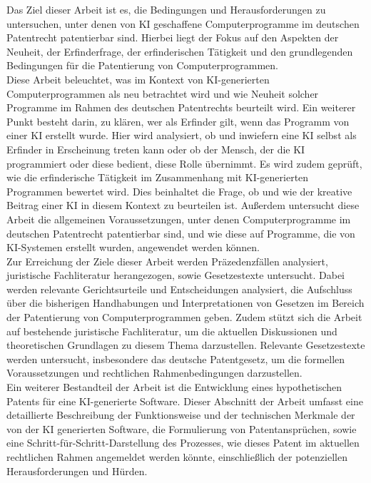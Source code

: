 Das Ziel dieser Arbeit ist es, 
die Bedingungen und Herausforderungen zu untersuchen,
unter denen von KI geschaffene Computerprogramme im deutschen Patentrecht 
patentierbar sind. Hierbei liegt der Fokus auf den Aspekten der Neuheit, 
der Erfinderfrage, der erfinderischen Tätigkeit 
und den grundlegenden Bedingungen für die Patentierung von Computerprogrammen. 
\\

Diese Arbeit beleuchtet, 
was im Kontext von KI-generierten Computerprogrammen 
als neu betrachtet wird 
und wie Neuheit solcher Programme 
im Rahmen des deutschen Patentrechts beurteilt wird. 
Ein weiterer Punkt besteht darin, zu klären, 
wer als Erfinder gilt,
wenn das Programm von einer KI erstellt wurde. 
Hier wird analysiert, 
ob und inwiefern eine KI selbst als Erfinder in Erscheinung treten kann 
oder ob der Mensch, der die KI programmiert oder diese bedient, 
diese Rolle übernimmt. 
Es wird zudem geprüft, 
wie die erfinderische Tätigkeit im Zusammenhang 
mit KI-generierten Programmen bewertet wird. 
Dies beinhaltet die Frage, 
ob und wie der kreative Beitrag einer KI in diesem Kontext zu beurteilen ist. 
Außerdem untersucht diese Arbeit die allgemeinen Voraussetzungen, 
unter denen Computerprogramme im deutschen Patentrecht patentierbar sind, 
und wie diese auf Programme, 
die von KI-Systemen erstellt wurden, angewendet werden können. 
\\

Zur Erreichung der Ziele dieser Arbeit werden Präzedenzfällen analysiert, 
juristische Fachliteratur herangezogen, sowie Gesetzestexte untersucht. 
Dabei werden relevante Gerichtsurteile und Entscheidungen analysiert, 
die Aufschluss über die bisherigen Handhabungen 
und Interpretationen 
von Gesetzen im Bereich der Patentierung von Computerprogrammen geben. 
Zudem stützt sich die Arbeit auf bestehende juristische Fachliteratur, 
um die aktuellen Diskussionen 
und theoretischen Grundlagen zu diesem Thema darzustellen. 
Relevante Gesetzestexte werden untersucht, insbesondere das deutsche Patentgesetz, 
um die formellen Voraussetzungen und rechtlichen Rahmenbedingungen darzustellen. 
\\

Ein weiterer Bestandteil der Arbeit ist die Entwicklung eines hypothetischen Patents 
für eine KI-generierte Software. 
Dieser Abschnitt der Arbeit umfasst eine detaillierte Beschreibung der Funktionsweise 
und der technischen Merkmale der von der KI generierten Software, 
die Formulierung von Patentansprüchen, 
sowie eine Schritt-für-Schritt-Darstellung des Prozesses, 
wie dieses Patent im aktuellen rechtlichen Rahmen angemeldet werden könnte, 
einschließlich der potenziellen Herausforderungen und Hürden. 
\\

